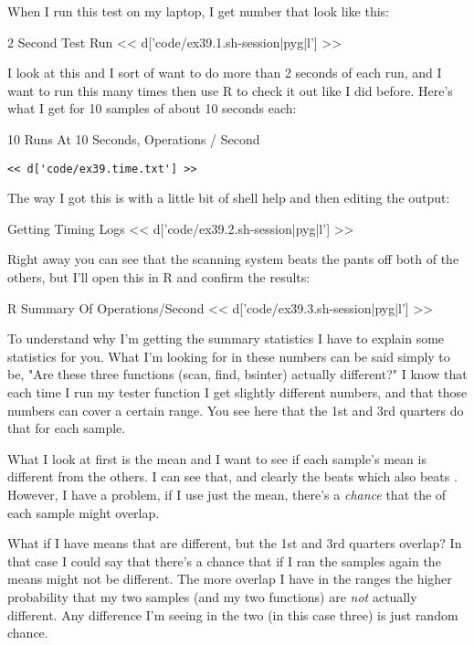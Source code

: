 When I run this test on my laptop, I get number that look like this:

\begin{code}{2 Second Test Run}
<< d['code/ex39.1.sh-session|pyg|l'] >>
\end{code}

I look at this and I sort of want to do more than 2 seconds of each run, and I
want to run this many times then use R to check it out like I did before.
Here's what I get for 10 samples of about 10 seconds each:

\begin{code}{10 Runs At 10 Seconds, Operations / Second}
\begin{Verbatim}
<< d['code/ex39.time.txt'] >>
\end{Verbatim}
\end{code}

The way I got this is with a little bit of shell help and then editing the
output:

\begin{code}{Getting Timing Logs}
<< d['code/ex39.2.sh-session|pyg|l'] >>
\end{code}

Right away you can see that the scanning system beats the pants off both of the
others, but I'll open this in R and confirm the results:

\begin{code}{R Summary Of Operations/Second}
<< d['code/ex39.3.sh-session|pyg|l'] >>
\end{code}

To understand why I'm getting the summary statistics I have to explain some
statistics for you.  What I'm looking for in these numbers can be said simply
to be, "Are these three functions (scan, find, bsinter) actually different?"  I
know that each time I run my tester function I get slightly different numbers,
and that those numbers can cover a certain range.  You see here that the
1st and 3rd quarters do that for each sample.

What I look at first is the mean and I want to see if each sample's mean is
different from the others.  I can see that, and clearly the  beats
 which also beats .  However, I have a problem, if I
use just the mean, there's a \emph{chance} that the  of each
sample might overlap.

What if I have means that are different, but the 1st and 3rd quarters overlap?
In that case I could say that there's a chance that if I ran the samples again
the means might not be different.  The more overlap I have in the ranges the
higher probability that my two samples (and my two functions) are \emph{not}
actually different.  Any difference I'm seeing in the two (in this case three)
is just random chance.

